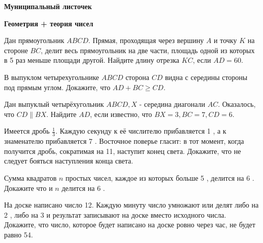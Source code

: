 \centerline{\bf \Huge Муниципальный листочек}
\centerline{\bf \Huge Геометрия + теория чисел}

Дан прямоугольник $A B C D$. Прямая, проходящая через вершину $A$ и точку $K$ на стороне $B C$, делит весь прямоугольник на две части, площадь одной из которых в 5 раз меньше площади другой. Найдите длину отрезка $K C$, если $A D=60$.

В выпуклом четырехугольнике $A B C D$ сторона $C D$ видна с середины стороны под прямым углом. Докажите, что $A D+B C \geqslant C D$.

Дан выпуклый четырёхугольник $A B C D, X$ - середина диагонали $A C$. Оказалось, что $C D \| B X$. Найдите $A D$, если известно, что $B X=3, B C=7, C D=6$.

Имеется дробь $\frac{1}{3}$. Каждую секунду к её числителю прибавляется 1 , а к знаменателю прибавляется 7 . Восточное поверье гласит: в тот момент, когда получится дробь, сократимая на 11, наступит конец света. Докажите, что не следует бояться наступления конца света.

Сумма квадратов $n$ простых чисел, каждое из которых больше 5 , делится на 6 . Докажите что и $n$ делится на 6 .

На доске написано число 12. Каждую минуту число умножают или делят либо на 2 , либо на 3 и результат записывают на доске вместо исходного числа. Докажите, что число, которое будет написано на доске ровно через час, не будет равно 54.